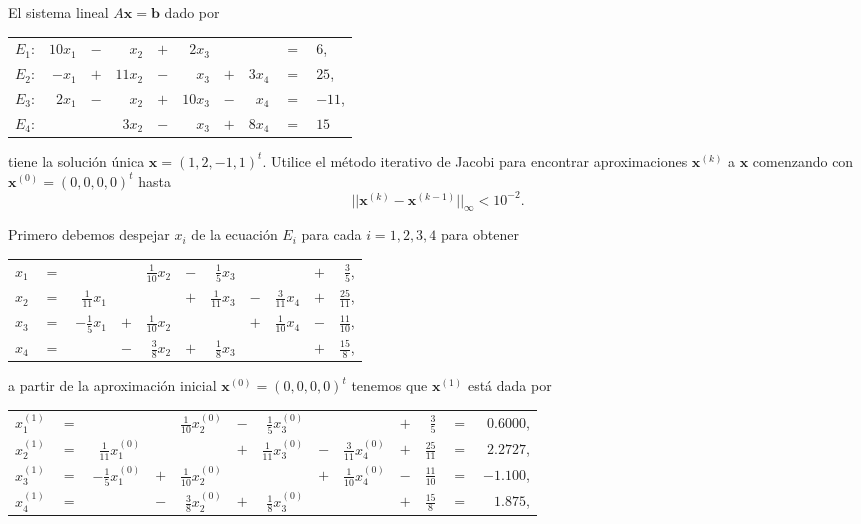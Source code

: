 \begin{exerciseT}
El sistema lineal $A\textbf{x}=\textbf{b}$ dado por
\begin{center}
\begin{tabular}{lrcrcrcrcl}
$E_1$: & $10x_1$ & $-$ & $x_2$ & $+$ & $2x_3$ &  &  & $=$ & $6$,\\
$E_2$: & $-x_1$ & $+$ & $11x_2$ & $-$ & $x_3$ & $+$ & $3x_4$ & $=$ & $25$,\\
$E_3$: & $2x_1$ & $-$ & $x_2$ & $+$ & $10x_3$ & $-$ & $x_4$ & $=$ & $-11$,\\
$E_4$: &  &  & $3x_2$ & $-$ & $x_3$ & $+$ & $8x_4$ & $=$ & $15$\\
\end{tabular}
\end{center}
tiene la solución única $\textbf{x}=(1,2,-1,1)^t$. Utilice el método iterativo de Jacobi para encontrar aproximaciones $\textbf{x}^{(k)}$ a $\textbf{x}$
comenzando con $\textbf{x}^{(0)} = (0,0,0,0)^t$ hasta
\begin{equation*}
 ||\textbf{x}^{(k)} - \textbf{x}^{(k-1)}||_{\infty} < 10^{-2}.
\end{equation*}

Primero debemos despejar $x_i$ de la ecuación $E_i$ para cada $i=1,2,3,4$ para obtener
\begin{table}[H]
	\centering
	\begin{tabular}{lcrcrcrcrcr}
		$x_1$ & $=$ &  &  & $\frac{1}{10}x_2$ & $-$ & $\frac{1}{5}x_3$ & & & $+$ & $\frac{3}{5}$,\\
		$x_2$ & $=$ & $\frac{1}{11}x_1$ &  &  & $+$ & $\frac{1}{11}x_3$ & $-$ & $\frac{3}{11}x_4$ & $+$ & $\frac{25}{11}$,\\
		$x_3$ & $=$ & $-\frac{1}{5}x_1$ & $+$ & $\frac{1}{10}x_2$ & & & $+$ & $\frac{1}{10}x_4$ & $-$ & $\frac{11}{10}$,\\
		$x_4$ & $=$ &  & $-$ & $\frac{3}{8}x_2$ & $+$ & $\frac{1}{8}x_3$ & & & $+$ & $\frac{15}{8}$,\\
	\end{tabular}
\end{table}

a partir de la aproximación inicial $\textbf{x}^{(0)}=(0,0,0,0)^t$ tenemos que $\textbf{x}^{(1)}$ está dada por
\begin{table}[H]
	\centering
	\begin{tabular}{lcrcrcrcrcrcr}
	$x_1^{(1)}$ & $=$ &  &  & $\frac{1}{10}x_2^{(0)}$ & $-$ & $\frac{1}{5}x_3^{(0)}$ & & & $+$ & $\frac{3}{5}$ & $=$ & $0.6000$,\\
	$x_2^{(1)}$ & $=$ & $\frac{1}{11}x_1^{(0)}$ &  &  & $+$ & $\frac{1}{11}x_3^{(0)}$ & $-$ & $\frac{3}{11}x_4^{(0)}$ & $+$ & $\frac{25}{11}$ & $=$ 
	&  $2.2727$,\\
	$x_3^{(1)}$ & $=$ & $-\frac{1}{5}x_1^{(0)}$ & $+$ & $\frac{1}{10}x_2^{(0)}$ & & & $+$ & $\frac{1}{10}x_4^{(0)}$ & $-$ & $\frac{11}{10}$ & $=$ & $-1.100$,\\
	$x_4^{(1)}$ & $=$ &  & $-$ & $\frac{3}{8}x_2^{(0)}$ & $+$ & $\frac{1}{8}x_3^{(0)}$ & & & $+$ & $\frac{15}{8}$ & $=$ & $1.875$,\\
\end{tabular}
\end{table}


\end{exerciseT}
